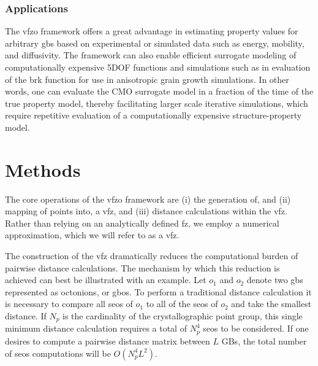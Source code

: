 \documentclass[preprint,12pt]{elsarticle}
\begin{document}
\subsubsection{Applications}

The \gls{vfzo} framework offers a great advantage in estimating property values for arbitrary \glspl{gb} based on experimental or simulated data such as energy, mobility, and diffusivity. The framework can also enable efficient surrogate modeling of computationally expensive 5DOF functions and simulations such as in evaluation of the \gls{brk} function for use in anisotropic grain growth simulations. In other words, one can evaluate the CMO surrogate model in a fraction of the time of the true property model, thereby facilitating larger scale iterative simulations, which require repetitive evaluation of a computationally expensive structure-property model.


\section{Methods} \label{sec:methods}

The core operations of the \gls{vfzo} framework are (i) the generation of, and (ii) mapping of points into, a \gls{vfz}, and (iii) distance calculations within the \gls{vfz}. Rather than relying on an analytically defined \gls{fz}, we employ a numerical approximation, which we will refer to as a \gls{vfz}.

The construction of the \gls{vfz} dramatically reduces the computational burden of pairwise distance calculations. The mechanism by which this reduction is achieved can best be illustrated with an example. Let $o_1$ and $o_2$ denote two \glspl{gb} represented as octonions, or \glspl{gbo}. 
To perform a traditional distance calculation it is necessary to compare all \glspl{seo} of $o_1$ to all of the \glspl{seo} of $o_2$ and take the smallest distance. If $N_p$ is the cardinality of the crystallographic point group, this single minimum distance calculation requires a total of $N_p^4$ \glspl{seo} to be considered. If one desires to compute a pairwise distance matrix between $L$ GBs, the total number of \glspl{seo} computations will be $O(N_p^4L^2)$.
\end{document}
